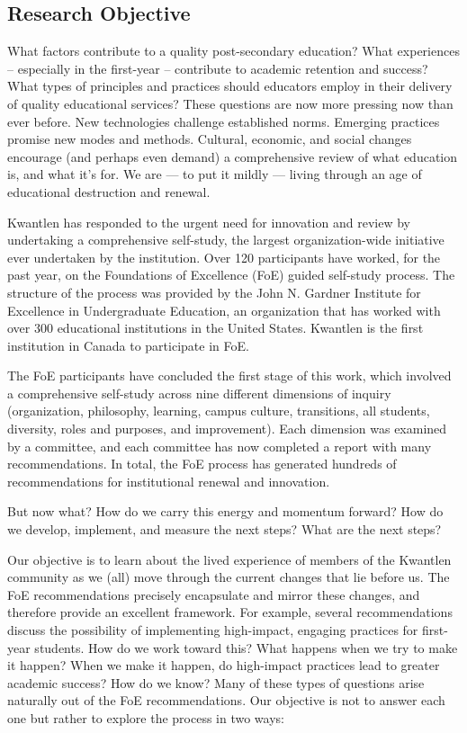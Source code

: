 \documentclass[letterpaper,10pt,headsepline]{scrreprt}
\begin{document}
\subsection{Research Objective}

What factors contribute to a quality post-secondary education? What
experiences -- especially in the first-year -- contribute to academic
retention and success? What types of principles and practices should educators
employ in their delivery of quality educational services? These questions are
now more pressing now than ever before. New technologies challenge established
norms. Emerging practices promise new modes and methods. Cultural, economic,
and social changes encourage (and perhaps even demand) a comprehensive review
of what education is, and what it's for. We are --- to put it mildly ---
living through an age of educational destruction and renewal.

Kwantlen has responded to the urgent need for innovation and review by
undertaking a comprehensive self-study, the largest organization-wide
initiative ever undertaken by the institution. Over 120 participants have
worked, for the past year, on the Foundations of Excellence (FoE) guided
self-study process. The structure of the process was provided by the John N.
Gardner Institute for Excellence in Undergraduate Education, an organization
that has worked with over 300 educational institutions in the United States.
Kwantlen is the first institution in Canada to participate in FoE.

The FoE participants have concluded the first stage of this work, which
involved a comprehensive self-study across nine different dimensions of
inquiry (organization, philosophy, learning, campus culture, transitions, all
students, diversity, roles and purposes, and improvement). Each dimension was
examined by a committee, and each committee has now completed a report with
many recommendations. In total, the FoE process has generated hundreds of
recommendations for institutional renewal and innovation.

But now what? How do we carry this energy and momentum forward? How do we
develop, implement, and measure the next steps? What are the next steps?

Our objective is to learn about the lived experience of members of the
Kwantlen community as we (all) move through the current changes that lie
before us. The FoE recommendations precisely encapsulate and mirror these
changes, and therefore provide an excellent framework. For example, several
recommendations discuss the possibility of implementing high-impact, engaging
practices for first-year students. How do we work toward this? What happens
when we try to make it happen? When we make it happen, do high-impact
practices lead to greater academic success? How do we know? Many of these
types of questions arise naturally out of the FoE recommendations. Our
objective is not to answer each one but rather to explore the process in two
ways:
\end{document}
